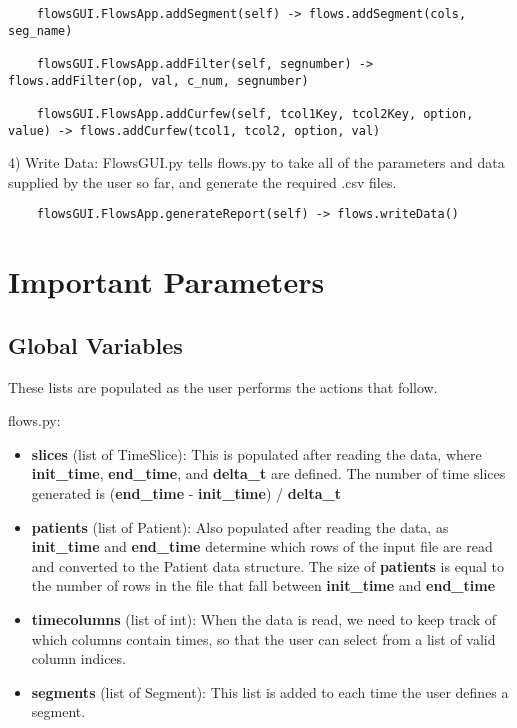 \documentclass{article}
\begin{document}
\medskip

\begin{lstlisting}
	flowsGUI.FlowsApp.addSegment(self) -> flows.addSegment(cols, seg_name)
	
	flowsGUI.FlowsApp.addFilter(self, segnumber) -> flows.addFilter(op, val, c_num, segnumber)
	
	flowsGUI.FlowsApp.addCurfew(self, tcol1Key, tcol2Key, option, value) -> flows.addCurfew(tcol1, tcol2, option, val)
\end{lstlisting}

4) Write Data: FlowsGUI.py tells flows.py to take all of the parameters and data supplied by the user so far, and generate the required .csv files.

\medskip

\begin{lstlisting}
	flowsGUI.FlowsApp.generateReport(self) -> flows.writeData()
\end{lstlisting}

\section{Important Parameters}

\subsection*{Global Variables}

These lists are populated as the user performs the actions that follow.

flows.py:

\begin{itemize}
	\item \textbf{slices} (list of TimeSlice): This is populated after reading the data, where \textbf{init\_time}, \textbf{end\_time}, and \textbf{delta\_t} are defined. The number of time slices generated is (\textbf{end\_time} - \textbf{init\_time}) / \textbf{delta\_t}
	\item \textbf{patients} (list of Patient): Also populated after reading the data, as \textbf{init\_time} and \textbf{end\_time} determine which rows of the input file are read and converted to the Patient data structure. The size of \textbf{patients} is equal to the number of rows in the file that fall between \textbf{init\_time} and \textbf{end\_time}
	\item \textbf{timecolumns} (list of int): When the data is read, we need to keep track of which columns contain times, so that the user can select from a list of valid column indices.
	\item \textbf{segments} (list of Segment): This list is added to each time the user defines a segment.
\end{itemize}
\end{document}

